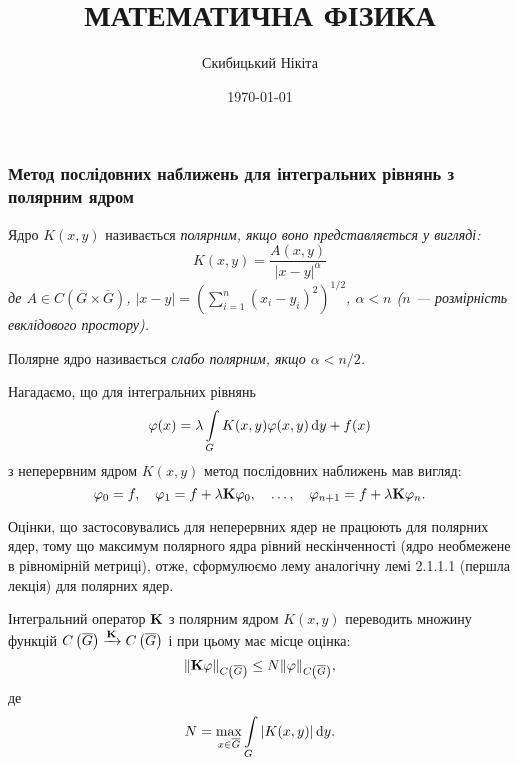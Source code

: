  

 \title{{\Huge МАТЕМАТИЧНА ФІЗИКА}}
 \author{Скибицький Нікіта}
 \date{\today}

 



 \tableofcontents

 \setcounter{section}{2}
 \setcounter{subsection}{1}
 \setcounter{subsubsection}{4}
 \setcounter{equation}{39}

\subsubsection{Метод послідовних наближень для інтегральних рівнянь з полярним ядром}

\begin{definition}
	Ядро $K(x, y)$ називається \it{полярним}, якщо воно представляється у вигляді:
	\begin{equation}
		K(x, y) = \dfrac{A(x, y)}{|x - y|^\alpha}
	\end{equation}
	де $A \in C\left(\overline G \times \overline G\right)$, $|x - y| = \left( \sum_{i = 1}^n (x_i - y_i)^2 \right)^{1/2}$, $\alpha < n$ ($n$ --- розмірність евклідового простору).
\end{definition}

\begin{definition}
	Полярне ядро називається \it{слабо полярним}, якщо $\alpha < n / 2$.
\end{definition}

Нагадаємо, що для інтегральних рівнянь 
\begin{equation}
	\phi(x) = \lambda \Int_G K(x, y) \phi(x, y) \diff y + f(x)
\end{equation}
з неперервним ядром $K(x, y)$ метод послідовних наближень мав вигляд: 
\begin{equation}
	\phi_0 = f, \quad \phi_1 = f + \lambda \bf{K} \phi_0, \quad \ldots, \quad \phi_{n + 1} = f + \lambda \bf{K} \phi_n.
\end{equation}	

Оцінки, що застосовувались для неперервних ядер не працюють для полярних ядер, тому що максимум полярного ядра рівний нескінченності (ядро необмежене в рівномірній метриці), отже, сформулюємо лему аналогічну лемі 2.1.1.1 (першла лекція) %
для полярних ядер. 

\begin{lemma}
	Інтегральний оператор $\bf{K}$ з полярним ядром $K(x, y)$ переводить множину функцій $C\left(\overline G\right) \xrightarrow{\bf{K}} C \left(\overline G\right)$ і при цьому має місце оцінка: 
	\begin{equation}
		\| \bf{K} \phi \|_{C\left(\overline G\right)} \le N \| \phi\|_{C\left(\overline G\right)},
	\end{equation}
	де 
	\begin{equation}
		N = \Max_{x \in \overline G} \Int_G |K(x, y)| \diff y.
	\end{equation}
\end{lemma}

